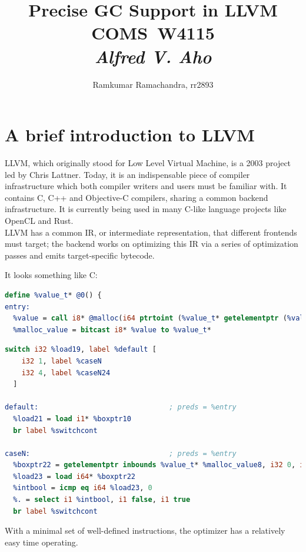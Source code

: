 \documentclass{article}
\title{
\vspace{2in}
\textmd{\textbf{Precise GC Support in LLVM}}\\
\vspace{0.1in}\large{COMS\ W4115}\\
\vspace{0.1in}\large{\textit{Alfred V. Aho}}
\vspace{2in}
}
\author{Ramkumar Ramachandra, rr2893}
\begin{document}
\maketitle
\newpage
\tableofcontents
\newpage
\section{A brief introduction to LLVM}
LLVM, which originally stood for Low Level Virtual Machine, is a 2003
project led by Chris Lattner. Today, it is an indispensable piece of
compiler infrastructure which both compiler writers and users must be
familiar with. It contains C, C++ and Objective-C compilers, sharing a
common backend infrastructure. It is currently being used in many
C-like language projects like OpenCL and Rust.\\

LLVM has a common IR, or intermediate representation, that different
frontends must target; the backend works on optimizing this IR via a
series of optimization passes and emits target-specific bytecode.

It looks something like C:
\begin{lstlisting}[language=llvm]
define %value_t* @0() {
entry:
  %value = call i8* @malloc(i64 ptrtoint (%value_t* getelementptr (%value_t* null, i32 1) to i64))
  %malloc_value = bitcast i8* %value to %value_t*
\end{lstlisting}

\begin{lstlisting}[language=llvm]
  switch i32 %load19, label %default [
    i32 1, label %caseN
    i32 4, label %caseN24
  ]

default:                               ; preds = %entry
  %load21 = load i1* %boxptr10
  br label %switchcont

caseN:                                 ; preds = %entry
  %boxptr22 = getelementptr inbounds %value_t* %malloc_value8, i32 0, i32 1
  %load23 = load i64* %boxptr22
  %intbool = icmp eq i64 %load23, 0
  %. = select i1 %intbool, i1 false, i1 true
  br label %switchcont
\end{lstlisting}
With a minimal set of well-defined instructions, the optimizer has a
relatively easy time operating.\\
\end{document}
